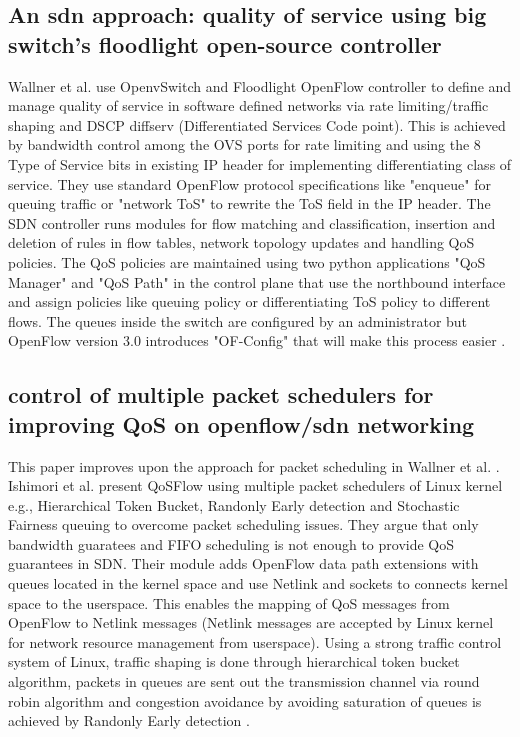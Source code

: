 \documentclass[paper=a4, fontsize=11pt]{scrartcl}	%
\numberwithin{equation}{section}		%
\numberwithin{figure}{section}			%
\numberwithin{table}{section}				%
\begin{document}
 \subsection{An sdn approach: quality of service using big switch's floodlight open-source controller}
 Wallner et al. use OpenvSwitch and Floodlight OpenFlow controller to define and manage quality of service in software defined networks via rate limiting/traffic shaping and DSCP diffserv (Differentiated Services Code point). This is achieved by bandwidth control among the OVS ports for rate limiting and using the 8 Type of Service bits in existing IP header for implementing differentiating class of service. They use standard OpenFlow protocol specifications like "enqueue" for queuing traffic or "network ToS" to rewrite the ToS field in the IP header. The SDN controller runs modules for flow matching and classification, insertion and deletion of rules in flow tables, network topology updates and handling QoS policies. The QoS policies are maintained using two python applications "QoS Manager" and "QoS Path" in the control plane that use the northbound interface and assign policies like queuing policy or differentiating ToS policy to different flows. The queues inside the switch are configured by an administrator but OpenFlow version 3.0 introduces "OF-Config" that will make this process easier \cite{bigswitch}.

\subsection{control of multiple packet schedulers for improving QoS on openflow/sdn networking}
This paper improves upon the approach for packet scheduling in Wallner et al. \cite{bigswitch}. Ishimori et al. present QoSFlow using multiple packet schedulers of Linux kernel e.g., Hierarchical Token Bucket, Randonly Early detection and Stochastic Fairness queuing to overcome packet scheduling issues. They argue that only bandwidth guaratees and FIFO scheduling is not enough to provide QoS guarantees in SDN. Their module adds OpenFlow data path extensions with queues located in the kernel space and use Netlink and sockets to connects kernel space to the userspace. This enables the mapping of QoS messages from OpenFlow to Netlink messages (Netlink messages are accepted by Linux kernel for network resource management from userspace). Using a strong traffic control system of Linux, traffic shaping is done through hierarchical token bucket algorithm, packets in queues are sent out the transmission channel via round robin algorithm and congestion avoidance by avoiding saturation of queues is achieved by Randonly Early detection \cite{scheduler}.
\end{document}
